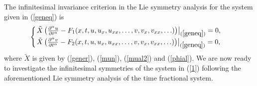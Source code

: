 \documentclass[12pt]{amsart}
\begin{document}
The infinitesimal invariance criterion in the Lie symmetry analysis for the system given in (\ref{geneq}) is
\begin{equation}\label{gende}
\begin{cases}
\left.\tilde{X}\left(\frac{\partial^\alpha u}{\partial t^\alpha}-F_1(x,t,u,u_x,u_{xx},\ldots, v, v_x, v_{xx},\ldots)\right)\right|_{(\ref{geneq})}=0,\\
\left.\tilde{X}\left(\frac{\partial^\alpha v}{\partial t^\alpha}-F_2(x,t,u,u_x,u_{xx},\ldots, v, v_x, v_{xx},\ldots)\right)\right|_{(\ref{geneq})}=0,
\end{cases}
\end{equation}
where $\tilde{X}$ is given by (\ref{gener}), (\ref{mun}), (\ref{mual2}) and (\ref{phial}). We are now ready to investigate the infinitesimal symmetries of the system in (\ref{1}) following the aforementioned Lie symmetry analysis of the time fractional system.
\end{document}
